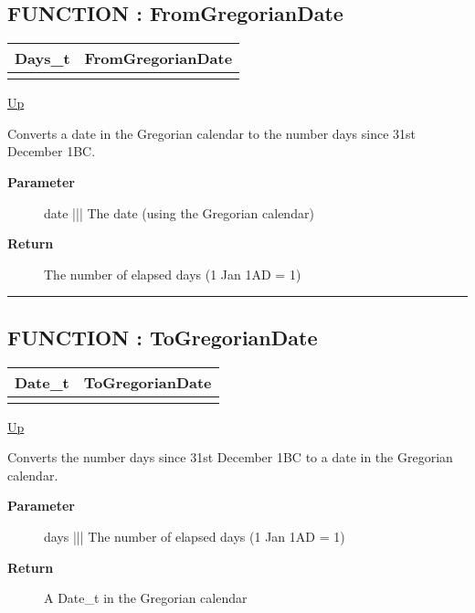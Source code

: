 \subsection*{FUNCTION : FromGregorianDate}
\hypertarget{ecldoc:date.fromgregoriandate}{}

{\renewcommand{\arraystretch}{1.5}
\begin{tabularx}{\textwidth}{|>{\raggedright\arraybackslash}l|X|}
\hline
\hspace{0pt}Days\_t & FromGregorianDate \\
\hline
\multicolumn{2}{|>{\raggedright\arraybackslash}X|}{\hspace{0pt}(Date\_t date)} \\
\hline
\end{tabularx}
}

\hyperlink{ecldoc:Date}{Up}

\par
Converts a date in the Gregorian calendar to the number days since 31st December 1BC.

\par
\begin{description}
\item [\textbf{Parameter}] date ||| The date (using the Gregorian calendar)
\item [\textbf{Return}] The number of elapsed days (1 Jan 1AD = 1)
\end{description}

\rule{\textwidth}{0.4pt}
\subsection*{FUNCTION : ToGregorianDate}
\hypertarget{ecldoc:date.togregoriandate}{}

{\renewcommand{\arraystretch}{1.5}
\begin{tabularx}{\textwidth}{|>{\raggedright\arraybackslash}l|X|}
\hline
\hspace{0pt}Date\_t & ToGregorianDate \\
\hline
\multicolumn{2}{|>{\raggedright\arraybackslash}X|}{\hspace{0pt}(Days\_t days)} \\
\hline
\end{tabularx}
}

\hyperlink{ecldoc:Date}{Up}

\par
Converts the number days since 31st December 1BC to a date in the Gregorian calendar.

\par
\begin{description}
\item [\textbf{Parameter}] days ||| The number of elapsed days (1 Jan 1AD = 1)
\item [\textbf{Return}] A Date\_t in the Gregorian calendar
\end{description}

